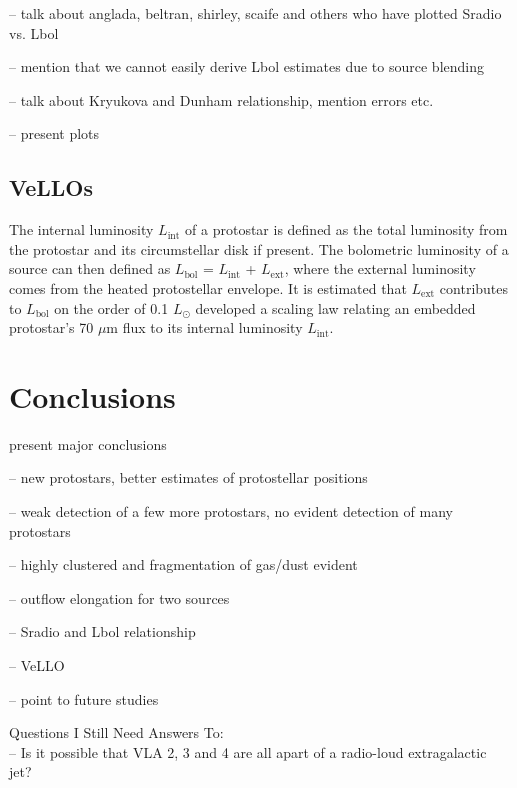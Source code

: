 \documentclass[apj]{emulateapj}
\begin{document}
-- talk about anglada, beltran, shirley, scaife and others who have plotted Sradio vs. Lbol

-- mention that we cannot easily derive Lbol estimates due to source blending

-- talk about Kryukova and Dunham relationship, mention errors etc.

-- present plots

\subsection{VeLLOs}
\label{sec:vellos}
The internal luminosity $L_{\text{int}}$ of a protostar is defined as the total luminosity from the protostar and its circumstellar disk if present. The bolometric luminosity of a source can then defined as $L_{\text{bol}}$ = $L_{\text{int}}$ + $L_{\text{ext}}$, where the external luminosity comes from the heated protostellar envelope. It is estimated that $L_{\text{ext}}$ contributes to $L_{\text{bol}}$ on the order of 0.1 $L_{\odot}$ \citet{Dunham08} developed a scaling law relating an embedded protostar's 70 $\mu$m flux to its internal luminosity $L_{\text{int}}$.

\citep{Dunham13}

\section{Conclusions}
\label{sec:conclusions}

present major conclusions

-- new protostars, better estimates of protostellar positions

-- weak detection of a few more protostars, no evident detection of many protostars

-- highly clustered and fragmentation of gas/dust evident

-- outflow elongation for two sources

-- Sradio and Lbol relationship

-- VeLLO

-- point to future studies

		
{}



\appendix
 
{\large Questions I Still Need Answers To:} \\[.1in]

-- Is it possible that VLA 2, 3 and 4 are all apart of a radio-loud extragalactic jet? \\
\end{document}
